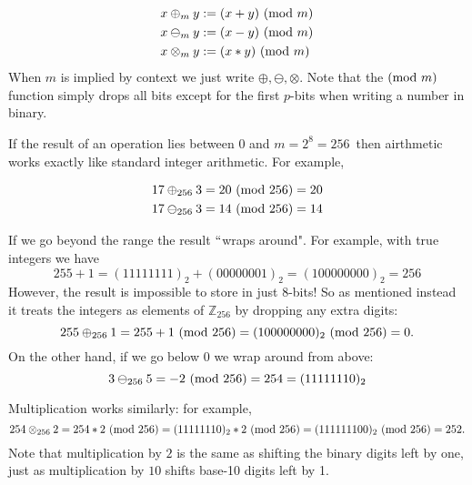 \begin{align*}
x \ensuremath{\oplus}_m y &:= (x+y)\ ({\rm mod}\ m) \\
x \ensuremath{\ominus}_m y &:= (x-y)\ ({\rm mod}\ m) \\
x \ensuremath{\otimes}_m y &:= (x*y)\ ({\rm mod}\ m)
\end{align*}
When $m$ is implied by context we just write $\ensuremath{\oplus}, \ensuremath{\ominus}, \ensuremath{\otimes}$. Note that  the $({\rm mod}\ m)$ function simply drops all bits except for the first $p$-bits when writing a number in binary.

\begin{example} If  the result of an operation lies between $0$ and $m = 2^8 = 256$ then airthmetic works exactly like standard integer arithmetic. For example,


\begin{align*}
17 \ensuremath{\oplus}_{256} 3 = 20\ ({\rm mod}\ 256) = 20 \\
17 \ensuremath{\ominus}_{256} 3 = 14\ ({\rm mod}\ 256) = 14
\end{align*}
\end{example}

\begin{example} If we go beyond the range the result \ensuremath{\ldq}wraps around". For example, with true integers we have
\[
255 + 1 = (11111111)_2 + (00000001)_2 = (100000000)_2 = 256
\]
However, the result is impossible to store in just 8-bits! So as mentioned instead it treats the integers as elements of ${\mathbb Z}_{256}$ by dropping any extra digits:
\[
255 \ensuremath{\oplus}_{256} 1 = 255 + 1 \ ({\rm mod}\ 256) = (100000000)_2 \ ({\rm mod}\ 256) = 0.
\]
On the other hand, if we go below $0$ we wrap around from above:
\[
3 \ensuremath{\ominus}_{256} 5 = -2\ ({\rm mod}\ 256) = 254 = (11111110)_2
\]
\end{example}

\begin{example} Multiplication works similarly: for example,
\[
254 \ensuremath{\otimes}_{256} 2 = 254 * 2 \ ({\rm mod}\ 256) = (11111110)_2 * 2  \ ({\rm mod}\ 256)
= (111111100)_2  \ ({\rm mod}\ 256) = 252.
\]
Note that multiplication by $2$ is the same as shifting the binary digits left by one, just as multiplication by $10$ shifts base-10 digits left by 1. \end{example}

